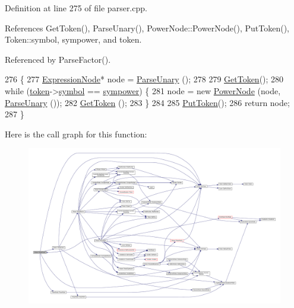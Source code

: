 Definition at line 275 of file parser.\+cpp.



References Get\+Token(), Parse\+Unary(), Power\+Node\+::\+Power\+Node(), Put\+Token(), Token\+::symbol, sympower, and token.



Referenced by Parse\+Factor().


\begin{DoxyCode}
276 \{
277     \hyperlink{classExpressionNode}{ExpressionNode}* node = \hyperlink{classParser_a446237993f806a92dd3e78ba8019f4f5}{ParseUnary} ();
278 
279     \hyperlink{classParser_a415a103e66558b4d366d9a1420561fe3}{GetToken}();
280     \textcolor{keywordflow}{while} (\hyperlink{classParser_a467028559d31c5b33f16ca8be56715cc}{token}->\hyperlink{structToken_aa671eaaae5632c5277e89a090d864820}{symbol} == \hyperlink{lex_8h_a7feef761cd73fac6e25b8bb80d2c4e54aebd05906bb437ef93900f895ecf6ea48}{sympower}) \{
281         node = \textcolor{keyword}{new} \hyperlink{classPowerNode}{PowerNode} (node, \hyperlink{classParser_a446237993f806a92dd3e78ba8019f4f5}{ParseUnary} ());
282         \hyperlink{classParser_a415a103e66558b4d366d9a1420561fe3}{GetToken} ();
283     \}
284 
285     \hyperlink{classParser_adb5c3a188b36f7ecb198ae30f06338b3}{PutToken}();
286     \textcolor{keywordflow}{return} node;
287 \}
\end{DoxyCode}


Here is the call graph for this function\+:\nopagebreak
\begin{figure}[H]
\begin{center}
\leavevmode
\includegraphics[width=350pt]{classParser_ad6ccc6e873d1fb3dcfa142655a5b0732_cgraph}
\end{center}
\end{figure}




